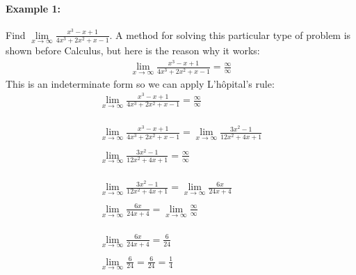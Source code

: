 \documentclass[../revisedmain.tex]{subfiles}
\begin{document}
	\paragraph{Example 1:} Find $\lim\limits_{x\to\infty}\frac{x^3-x+1}{4x^3+2x^2+x-1}$. A method for solving this particular type of problem is shown before Calculus, but here is the reason why it works:
	\begin{gather*}
		\lim_{x\to\infty}\frac{x^3-x+1}{4x^3+2x^2+x-1}=\frac{\infty}{\infty}
	\end{gather*}This is an indeterminate form so we can apply L'h\^opital's rule:
	\begin{gather*}
		\lim_{x\to\infty}\frac{x^3-x+1}{4x^3+2x^2+x-1}=\frac{\infty}{\infty}\\\\\\\\
		\lim_{x\to\infty}\frac{x^3-x+1}{4x^3+2x^2+x-1}=\lim_{x\to\infty}\frac{3x^2-1}{12x^2+4x+1}\\\\
		\lim_{x\to\infty}\frac{3x^2-1}{12x^2+4x+1}=\frac{\infty}{\infty}\\\\\\\\
		\lim_{x\to\infty}\frac{3x^2-1}{12x^2+4x+1}=\lim_{x\to\infty}\frac{6x}{24x+4}\\\\
		\lim_{x\to\infty}\frac{6x}{24x+4}=\lim_{x\to\infty}\frac{\infty}{\infty}\\\\\\\\
		\lim_{x\to\infty}\frac{6x}{24x+4}=\frac{6}{24}\\\\
		\lim_{x\to\infty}\frac{6}{24}=\frac{6}{24}=\frac{1}{4}\\
	\end{gather*}
\end{document}
